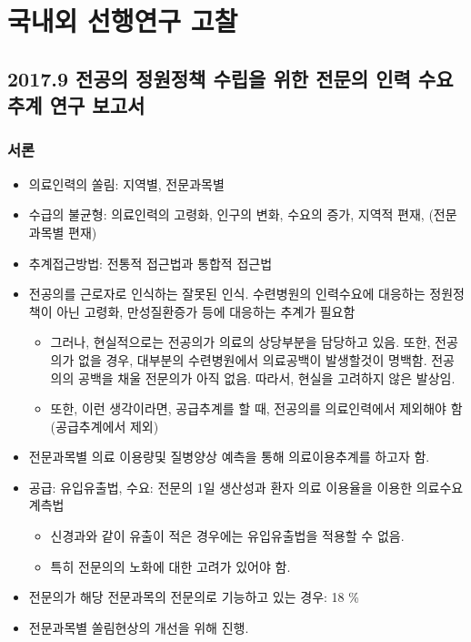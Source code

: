 \documentclass[]{book}
\providecommand{\tightlist}{%
  \setlength{\itemsep}{0pt}\setlength{\parskip}{0pt}}
\begin{document}
\hypertarget{section-2}{%
\chapter{국내외 선행연구 고찰}\label{section-2}}

\hypertarget{section-3}{%
\section{2017.9 전공의 정원정책 수립을 위한 전문의 인력 수요 추계 연구 보고서}\label{section-3}}

\hypertarget{section-4}{%
\subsection{서론}\label{section-4}}

\begin{itemize}
\item
  의료인력의 쏠림: 지역별, 전문과목별
\item
  수급의 불균형: 의료인력의 고령화, 인구의 변화, 수요의 증가, 지역적 편재, (전문과목별 편재)
\item
  추계접근방법: 전통적 접근법과 통합적 접근법
\item
  전공의를 근로자로 인식하는 잘못된 인식. 수련병원의 인력수요에 대응하는 정원정책이 아닌 고령화, 만성질환증가 등에 대응하는 추계가 필요함

  \begin{itemize}
  \tightlist
  \item
    그러나, 현실적으로는 전공의가 의료의 상당부분을 담당하고 있음. 또한, 전공의가 없을 경우, 대부분의 수련병원에서 의료공백이 발생할것이 명백함. 전공의의 공백을 채울 전문의가 아직 없음. 따라서, 현실을 고려하지 않은 발상임.
  \item
    또한, 이런 생각이라면, 공급추계를 할 때, 전공의를 의료인력에서 제외해야 함 (공급추계에서 제외)
  \end{itemize}
\item
  전문과목별 의료 이용량및 질병양상 예측을 통해 의료이용추계를 하고자 함.
\item
  공급: 유입유출법, 수요: 전문의 1일 생산성과 환자 의료 이용율을 이용한 의료수요 계측법

  \begin{itemize}
  \tightlist
  \item
    신경과와 같이 유출이 적은 경우에는 유입유출법을 적용할 수 없음.
  \item
    특히 전문의의 노화에 대한 고려가 있어야 함.
  \end{itemize}
\item
  전문의가 해당 전문과목의 전문의로 기능하고 있는 경우: 18 \%
\item
  전문과목별 쏠림현상의 개선을 위해 진행.


\end{itemize}
\end{document}
